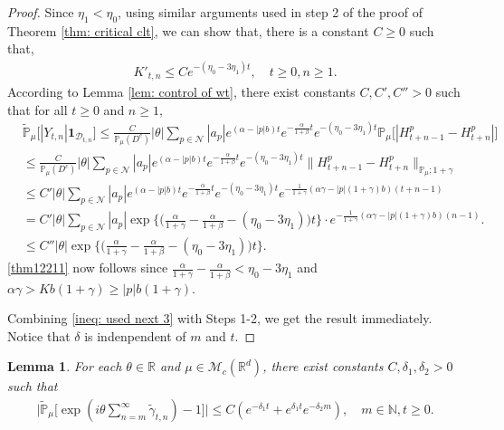 \documentclass[12pt,a4paper]{amsart}
\theoremstyle{plain}
\newtheorem{lem}[thm]{Lemma}
\theoremstyle{definition}
\numberwithin{equation}{section}
\begin{document}
\begin{proof}
    Since $\eta_1 < \eta_0$,  using similar arguments used in  step 2 of the proof of Theorem \ref{thm: critical clt}, we can show that, there is a constant $C\geq 0$ such that,
\begin{align}
\label{ineq: control of Kkt1}
     K'_{t,n}
     \leq C e^{-(\eta_0 - 3\eta_1) t},
     \quad t \geq 0, n\geq 1.
\end{align}
    According to Lemma \ref{lem: control of wt},
    there exist constants $C,C',C''>0$ such that  for all $t\geq 0$ and $n\geq 1$,
\begin{align}\label{ineq:used next 2}
    &\tilde{\mathbb{P}}_{\mu}\big[|Y_{t,n}|\mathbf{1}_{\mathcal{D}_{t,n}}\big]\leq \frac{C}{\mathbb{P}_{\mu}(D^c)} |\theta|\sum_{p\in\mathcal{N}}|a_p|e^{(\alpha-|p|b)t}e^{-\frac{\alpha}{1+\beta}t}e^{-(\eta_0-3\eta_1)t}\mathbb{P}_{\mu}\Big[|H_{t+n-1}^p-H_{t+n}^p|\Big]\\
    &\leq \frac{C}{\mathbb{P}_{\mu}(D^c)} |\theta|\sum_{p\in\mathcal{N}}|a_p|e^{(\alpha-|p|b)t}e^{-\frac{\alpha}{1+\beta}t}e^{-(\eta_0-3\eta_1)t}\|H_{t+n-1}^p-H_{t+n}^p\|_{\mathbb{P}_{\mu};1+\gamma}
    \\&\leq C' |\theta|\sum_{p\in\mathcal{N}}|a_p|e^{(\alpha-|p|b)t}e^{-\frac{\alpha}{1+\beta}t}e^{-(\eta_0-3\eta_1)t}e^{-\frac{1}{1+\gamma}(\alpha\gamma-|p|(1+\gamma)b)(t+n-1)}\\
    &=C'|\theta|\sum_{p\in\mathcal{N}}|a_p|\exp\Big\{\Big(\frac{\alpha}{1+\gamma}-\frac{\alpha}{1+\beta}-(\eta_0-3\eta_1)\Big)t\Big\}\cdot e^{-\frac{1}{1+\gamma}(\alpha\gamma-|p|(1+\gamma)b)(n-1)}.\\
    &\leq C''|\theta|\exp\Big\{\Big(\frac{\alpha}{1+\gamma}-\frac{\alpha}{1+\beta}-(\eta_0-3\eta_1)\Big)t\Big\}.
\end{align}
    \eqref{thm12211} now follows  since $\frac{\alpha}{1+\gamma}-\frac{\alpha}{1+\beta}<\eta_0-3\eta_1$ and $\alpha\gamma>Kb(1+\gamma)\geq |p|b(1+\gamma)$.
  
    Combining \eqref{ineq: used next 3} with Steps 1-2, we get the result immediately. Notice that $\delta$ is indenpendent of $m$ and $t$.
\end{proof}
\begin{lem}\label{lem: lemma05}
    For each $\theta\in \mathbb{R}$ and $\mu \in \mathcal{M}_c(\mathbb{R}^d)$, there exist constants $C,\delta_1,\delta_2>0$ such that
\begin{align}
    \Big|\tilde{\mathbb{P}}_{\mu}\Big[\exp(i\theta \sum_{n=m}^{\infty}\tilde{\gamma}_{t,n})-1\Big]\Big|
    \leq C(e^{-\delta_1 t}+e^{\delta_1 t}e^{-\delta_2 m}),
    \quad m\in \mathbb{N}, t\geq 0.
\end{align}
\end{lem}
\end{document}
